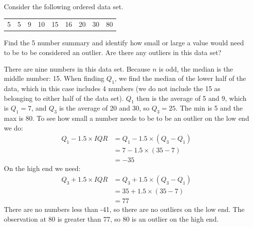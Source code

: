 \begin{examplewrap}
\begin{nexample}
{Consider the following ordered data set.
\begin{center}
\begin{tabular}{ccc ccc ccc}
5 & 5 & 9 & 10 & 15 & 16 & 20 & 30 & 80 
\end{tabular}
\end{center}
Find the 5 number summary and identify how small or large a value would need to be to be considered an outlier.  Are there any outliers in this data set?}
There are nine numbers in this data set.  Because $n$ is odd, the median is the middle number: 15.  When finding $Q_1$, we find the median of the lower half of the data, which in this case includes 4 numbers (we do not include the 15 as belonging to either half of the data set).  $Q_1$ then is the average of 5 and 9, which is $Q_1 = 7$, and $Q_3$ is the average of 20 and 30, so $Q_3 = 25$.  The min is 5 and the max is 80.  To see how small a number needs to be to be an outlier on the low end we do:
\begin{align*}
Q_1 - 1.5 \times IQR
	&= Q_1 - 1.5 \times (Q_3 - Q_1) \\
	& = 7 - 1.5 \times (35 - 7) \\
	& = -35
\end{align*}
On the high end we need:
\begin{align*}
Q_3 + 1.5 \times IQR
	& = Q_3 + 1.5 \times (Q_3-Q_1) \\
	& = 35 + 1.5 \times (35 - 7) \\
	& = 77
\end{align*}
There are no numbers less than -41, so there are no outliers on the low end. The observation at 80 is greater than 77, so 80 is an outlier on the high end.
\end{nexample}
\end{examplewrap}




